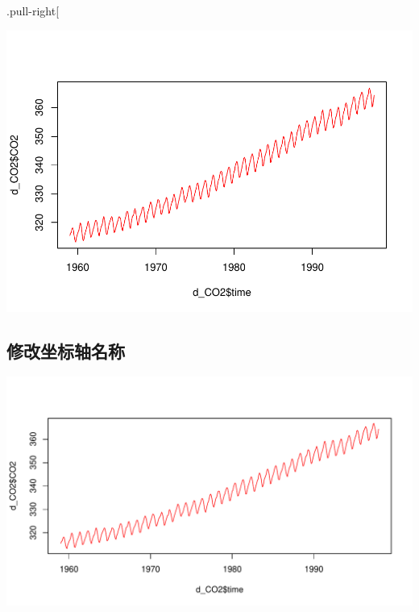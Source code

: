 \documentclass[
]{book}
\newenvironment{Shaded}{\begin{snugshade}}{\end{snugshade}}
\newcommand{\AttributeTok}[1]{\textcolor[rgb]{0.77,0.63,0.00}{#1}}
\newcommand{\DecValTok}[1]{\textcolor[rgb]{0.00,0.00,0.81}{#1}}
\newcommand{\FunctionTok}[1]{\textcolor[rgb]{0.00,0.00,0.00}{#1}}
\newcommand{\NormalTok}[1]{#1}
\newcommand{\SpecialCharTok}[1]{\textcolor[rgb]{0.00,0.00,0.00}{#1}}
\newcommand{\StringTok}[1]{\textcolor[rgb]{0.31,0.60,0.02}{#1}}
\begin{document}
.pull-right{[}

\includegraphics[width=576px]{bookdown-demo_files/figure-latex/unnamed-chunk-57-1}

\hypertarget{ux4feeux6539ux5750ux6807ux8f74ux540dux79f0}{%
\subsection{修改坐标轴名称}\label{ux4feeux6539ux5750ux6807ux8f74ux540dux79f0}}

\begin{Shaded}
\end{Shaded}

\includegraphics[width=576px]{bookdown-demo_files/figure-latex/unnamed-chunk-58-1}
\end{document}
